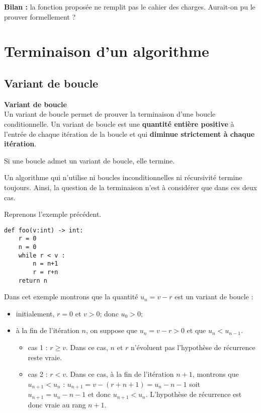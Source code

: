 \bigskip

\textbf{Bilan : } la fonction proposée ne remplit pas le cahier des charges. Aurait-on pu le prouver formellement ?

\section{Terminaison d'un algorithme}

\subsection{Variant de boucle}
\begin{defi} \textbf{Variant de boucle} \\
Un variant de boucle permet de prouver la terminaison d'une boucle conditionnelle.  Un variant de boucle est une \textbf{quantité entière positive} à l’entrée de chaque
itération de la boucle et qui \textbf{diminue strictement à chaque itération}.
\end{defi}

\begin{theorem}
Si une boucle admet un variant de boucle, elle termine.
\end{theorem}

\begin{rem}
Un algorithme qui n’utilise ni boucles inconditionnelles ni récursivité termine toujours. Ainsi,
la question de la terminaison n’est à considérer que dans ces deux cas.
\end{rem}

Reprenons l'exemple précédent. 
\begin{lstlisting}
def foo(v:int) -> int:
    r = 0
    n = 0
    while r < v : 
        n = n+1
        r = r+n
    return n
\end{lstlisting}

Dans cet exemple montrons que la quantité $u_n = v-r$ est un variant de boucle : 
\begin{itemize}
\item initialement, $r=0$ et $v>0$; donc  $u_0 > 0$;
\item à la fin de l'itération $n$, on suppose que $u_n = v-r >0$ et que $u_n < u_{n-1}$. 
\begin{itemize}
\item cas 1 : $r\geq v$. Dans ce cas, $n$ et $r$ n'évoluent pas l'hypothèse de récurrence reste vraie. 
\item cas 2 : $r < v$. Dans ce cas, à la fin de l'itération $n+1$,  montrons que  $u_{n+1} < u_{n}$ : $u_{n+1} = v - (r + n + 1) =  u_n -n - 1$ soit $u_{n+1} =u_n -n - 1$ et donc $u_{n+1} < u_{n}$. L'hypothèse de récurrence est donc vraie au rang $n+1$. 
\end{itemize}
\end{itemize}

